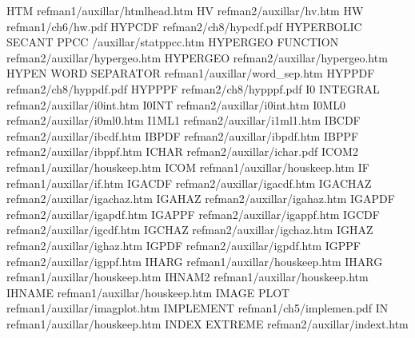 HTM                                     refman1/auxillar/htmlhead.htm
HV                                      refman2/auxillar/hv.htm
HW                                      refman1/ch6/hw.pdf
HYPCDF                                  refman2/ch8/hypcdf.pdf
HYPERBOLIC SECANT PPCC                  /auxillar/statppcc.htm
HYPERGEO FUNCTION                       refman2/auxillar/hypergeo.htm
HYPERGEO                                refman2/auxillar/hypergeo.htm
HYPEN WORD SEPARATOR                    refman1/auxillar/word_sep.htm
HYPPDF                                  refman2/ch8/hyppdf.pdf
HYPPPF                                  refman2/ch8/hypppf.pdf
I0 INTEGRAL                             refman2/auxillar/i0int.htm
I0INT                                   refman2/auxillar/i0int.htm
I0ML0                                   refman2/auxillar/i0ml0.htm
I1ML1                                   refman2/auxillar/i1ml1.htm
IBCDF                                   refman2/auxillar/ibcdf.htm
IBPDF                                   refman2/auxillar/ibpdf.htm
IBPPF                                   refman2/auxillar/ibppf.htm
ICHAR                                   refman2/auxillar/ichar.pdf
ICOM2                                   refman1/auxillar/houskeep.htm
ICOM                                    refman1/auxillar/houskeep.htm
IF                                      refman1/auxillar/if.htm
IGACDF                                  refman2/auxillar/igacdf.htm
IGACHAZ                                 refman2/auxillar/igachaz.htm
IGAHAZ                                  refman2/auxillar/igahaz.htm
IGAPDF                                  refman2/auxillar/igapdf.htm
IGAPPF                                  refman2/auxillar/igappf.htm
IGCDF                                   refman2/auxillar/igcdf.htm
IGCHAZ                                  refman2/auxillar/igchaz.htm
IGHAZ                                   refman2/auxillar/ighaz.htm
IGPDF                                   refman2/auxillar/igpdf.htm
IGPPF                                   refman2/auxillar/igppf.htm
IHARG                                   refman1/auxillar/houskeep.htm
IHARG                                   refman1/auxillar/houskeep.htm
IHNAM2                                  refman1/auxillar/houskeep.htm
IHNAME                                  refman1/auxillar/houskeep.htm
IMAGE PLOT                              refman1/auxillar/imagplot.htm
IMPLEMENT                               refman1/ch5/implemen.pdf
IN                                      refman1/auxillar/houskeep.htm
INDEX EXTREME                           refman2/auxillar/indext.htm
